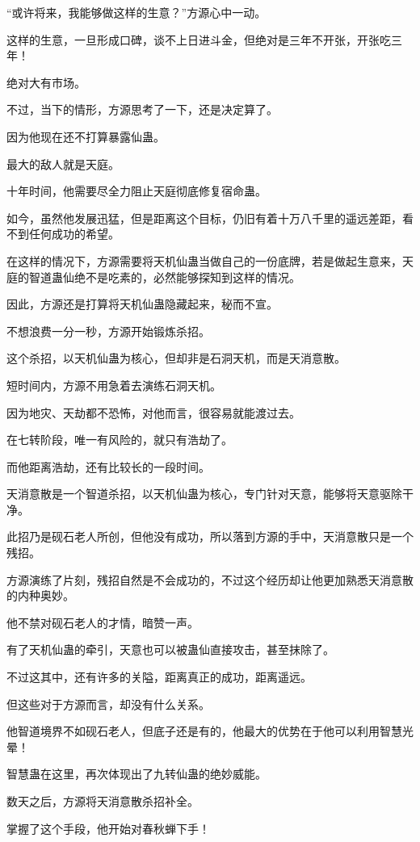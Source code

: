 \begin{this_body}
“或许将来，我能够做这样的生意？”方源心中一动。

这样的生意，一旦形成口碑，谈不上日进斗金，但绝对是三年不开张，开张吃三年！

绝对大有市场。

不过，当下的情形，方源思考了一下，还是决定算了。

因为他现在还不打算暴露仙蛊。

最大的敌人就是天庭。

十年时间，他需要尽全力阻止天庭彻底修复宿命蛊。

如今，虽然他发展迅猛，但是距离这个目标，仍旧有着十万八千里的遥远差距，看不到任何成功的希望。

在这样的情况下，方源需要将天机仙蛊当做自己的一份底牌，若是做起生意来，天庭的智道蛊仙绝不是吃素的，必然能够探知到这样的情况。

因此，方源还是打算将天机仙蛊隐藏起来，秘而不宣。

不想浪费一分一秒，方源开始锻炼杀招。

这个杀招，以天机仙蛊为核心，但却非是石洞天机，而是天消意散。

短时间内，方源不用急着去演练石洞天机。

因为地灾、天劫都不恐怖，对他而言，很容易就能渡过去。

在七转阶段，唯一有风险的，就只有浩劫了。

而他距离浩劫，还有比较长的一段时间。

天消意散是一个智道杀招，以天机仙蛊为核心，专门针对天意，能够将天意驱除干净。

此招乃是砚石老人所创，但他没有成功，所以落到方源的手中，天消意散只是一个残招。

方源演练了片刻，残招自然是不会成功的，不过这个经历却让他更加熟悉天消意散的内种奥妙。

他不禁对砚石老人的才情，暗赞一声。

有了天机仙蛊的牵引，天意也可以被蛊仙直接攻击，甚至抹除了。

不过这其中，还有许多的关隘，距离真正的成功，距离遥远。

但这些对于方源而言，却没有什么关系。

他智道境界不如砚石老人，但底子还是有的，他最大的优势在于他可以利用智慧光晕！

智慧蛊在这里，再次体现出了九转仙蛊的绝妙威能。

数天之后，方源将天消意散杀招补全。

掌握了这个手段，他开始对春秋蝉下手！

\end{this_body}

